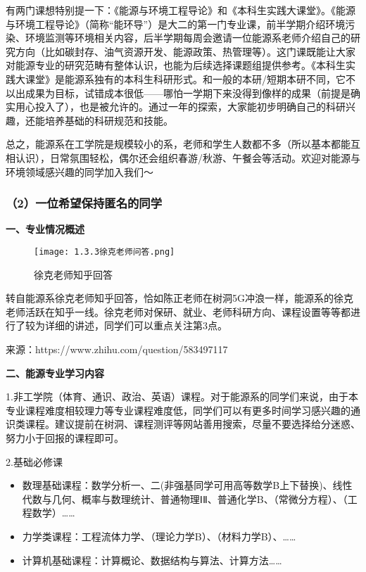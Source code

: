 \documentclass[11pt,oneside]{book}
\begin{document}
\vspace{10pt}

有两门课想特别提一下：《能源与环境工程导论》和《本科生实践大课堂》。《能源与环境工程导论》（简称“能环导”）是大二的第一门专业课，前半学期介绍环境污染、环境监测等环境相关内容，后半学期每周会邀请一位能源系老师介绍自己的研究方向（比如碳封存、油气资源开发、能源政策、热管理等）。这门课既能让大家对能源专业的研究范畴有整体认识，也能为后续选择课题组提供参考。《本科生实践大课堂》是能源系独有的本科生科研形式。和一般的本研/短期本研不同，它不以出成果为目标，试错成本很低——哪怕一学期下来没得到像样的成果（前提是确实用心投入了），也是被允许的。通过一年的探索，大家能初步明确自己的科研兴趣，还能培养基础的科研规范和技能。

\vspace{10pt}

总之，能源系在工学院是规模较小的系，老师和学生人数都不多（所以基本都能互相认识），日常氛围轻松，偶尔还会组织春游/秋游、午餐会等活动。欢迎对能源与环境领域感兴趣的同学加入我们～

\subsubsection{（2）一位希望保持匿名的同学}
\textbf{一、专业情况概述}

\begin{figure}[htbp]
	\centering
	\texttt{[image: 1.3.3徐克老师问答.png]}
	\renewcommand{\figurename}{图}
	\caption{徐克老师知乎回答}
	\label{fig:enter-label}
\end{figure}

转自能源系徐克老师知乎回答，恰如陈正老师在树洞5G冲浪一样，能源系的徐克老师活跃在知乎一线。徐克老师对保研、就业、老师科研方向、课程设置等等都进行了较为详细的讲述，同学们可以重点关注第3点。

来源：https://www.zhihu.com/question/583497117

\vspace{10pt}

\textbf{二、能源专业学习内容}

1.非工学院（体育、通识、政治、英语）课程。对于能源系的同学们来说，由于本专业课程难度相较理力等专业课程难度低，同学们可以有更多时间学习感兴趣的通识类课程。建议提前在树洞、课程测评等网站善用搜索，尽量不要选择给分迷惑、努力小于回报的课程即可。

\vspace{10pt}

2.基础必修课

\begin{itemize}
	\item 数理基础课程：数学分析一、二(非强基同学可用高等数学B上下替换)、线性代数与几何、概率与数理统计、普通物理ⅠⅡ、普通化学B、（常微分方程）、（工程数学）……
	
	\item 力学类课程：工程流体力学、（理论力学B）、（材料力学B）、……
	
	\item 计算机基础课程：计算概论、数据结构与算法、计算方法……
	
\end{itemize}
\end{document}
